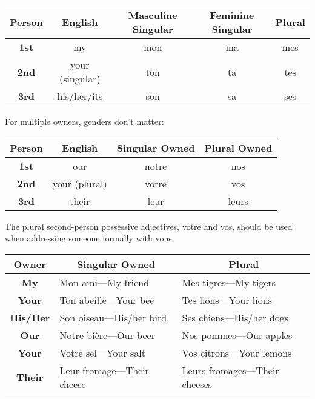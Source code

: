\begin{center}\begin{tabular}{|c|c|c|c|c|}
\hline
\textbf{Person} & \textbf{English} & \textbf{Masculine Singular} & \textbf{Feminine Singular} & \textbf{Plural} \\ \hline
\textbf{1st}    & my               & mon                         & ma                         & mes             \\ \hline
\textbf{2nd}    & your (singular)  & ton                         & ta                         & tes             \\ \hline
\textbf{3rd}    & his/her/its      & son                         & sa                         & ses             \\ \hline
\end{tabular}\end{center}

For multiple owners, genders don't matter:

\begin{center}\begin{tabular}{|c|c|c|c|}
\hline
\textbf{Person} & \textbf{English} & \textbf{Singular Owned} & \textbf{Plural Owned} \\ \hline
\textbf{1st}    & our              & notre                   & nos                   \\ \hline
\textbf{2nd}    & your (plural)    & votre                   & vos                   \\ \hline
\textbf{3rd}    & their            & leur                    & leurs                 \\ \hline
\end{tabular}\end{center}

The plural second-person possessive adjectives, votre and vos, should be used when addressing someone formally with vous.

\begin{center}\begin{tabular}{|c|l|l|}
\hline
\textbf{Owner}   & \multicolumn{1}{c|}{\textbf{Singular Owned}} & \multicolumn{1}{c|}{\textbf{Plural}} \\ \hline
\textbf{My}      & Mon ami---My friend                          & Mes tigres---My tigers               \\ \hline
\textbf{Your}    & Ton abeille---Your bee                       & Tes lions---Your lions               \\ \hline
\textbf{His/Her} & Son oiseau---His/her bird                    & Ses chiens---His/her dogs            \\ \hline
\textbf{Our}     & Notre bi{\`e}re---Our beer                   & Nos pommes---Our apples              \\ \hline
\textbf{Your}    & Votre sel---Your salt                        & Vos citrons---Your lemons            \\ \hline
\textbf{Their}   & Leur fromage---Their cheese                  & Leurs fromages---Their cheeses       \\ \hline
\end{tabular}\end{center}

